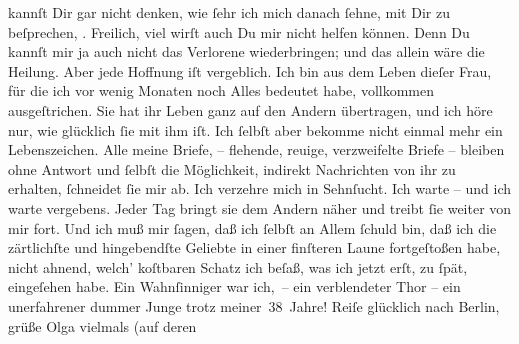 \begin{ledgroupsized}[t]{13cm}
               kannſt Dir gar nicht denken, wie ſehr ich mich danach ſehne, mit Dir zu beſprechen,
                  \label{K_L03363-3v}\label{K_L03363-3h}.
               Freilich, viel wirſt auch Du mir nicht helfen können. {\pb}Denn Du kannſt mir ja auch nicht das Verlorene
               wiederbringen; und das allein wäre die Heilung. Aber jede Hoffnung iſt vergeblich.
               Ich bin aus dem Leben dieſer Frau,  für die ich vor wenig Monaten
               noch Alles bedeutet habe, vollkommen ausgeſtrichen. Sie hat ihr Leben ganz auf den
                  Andern übertragen, und
               ich höre nur, wie glücklich ſie mit ihm iſt. Ich ſelbſt aber bekomme nicht einmal
               mehr ein Lebenszeichen. Alle meine Briefe, – flehende, reuige, verzweifelte Briefe –
                  {\pb}bleiben ohne Antwort und ſelbſt die Möglichkeit,
               indirekt Nachrichten\strikeout{\textcolor{gray}{×}} von ihr zu erhalten, ſchneidet ſie mir ab. Ich verzehre mich in Sehnſucht. Ich warte – und
               ich warte vergebens. Jeder Tag bringt sie dem Andern näher und treibt ſie weiter von mir fort. Und ich
               muß mir ſagen, daß ich ſelbſt an Allem ſchuld \introOben{}bin\introOben{}, daß ich
               die zärtlichſte und hingebendſte Geliebte in einer finſteren Laune fortgeſtoßen habe,
               nicht ahnend, {\pb}welch’ koſtbaren Schatz ich beſaß,
               was ich jetzt erſt, zu ſpät, eingeſehen habe. Ein Wahnſinniger war ich, – ein
               verblendeter Thor – ein unerfahrener dummer Junge trotz meiner 38 Jahre!{\dotsfour}\pend
           \pstart
           Reiſe glücklich nach Berlin, grüße Olga vielmals (auf deren \label{K_L03363-4v}
\end{ledgroupsized}
